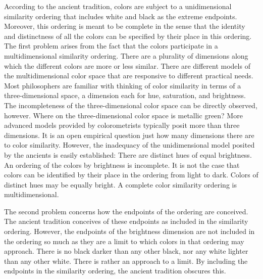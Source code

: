 According to the ancient tradition, colors are subject to a unidimensional similarity ordering that includes white and black as the extreme endpoints. Moreover, this ordering is meant to be complete in the sense that the identity and distinctness of all the colors can be specified by their place in this ordering. The first problem arises from the fact that the colors participate in a multidimensional similarity ordering. There are a plurality of dimensions along which the different colors are more or less similar. There are different models of the multidimensional color space that are responsive to different practical needs. Most philosophers are familiar with thinking of color similarity in terms of a three-dimensional space, a dimension each for hue, saturation, and brightness. The incompleteness of the three-dimensional color space can be directly observed, however. Where on the three-dimensional color space is metallic green? More advanced models provided by colorometrists typically posit more than three dimensions. It is an open empirical question just how many dimensions there are to color similarity. However, the inadequacy of the unidimensional model posited by the ancients is easily established: There are distinct hues of equal brightness. An ordering of the colors by brightness is incomplete. It is not the case that colors can be identified by their place in the ordering from light to dark. Colors of distinct hues may be equally bright. A complete color similarity ordering is multidimensional.

The second problem concerns how the endpoints of the ordering are conceived. The ancient tradition conceives of these endpoints as included in the similarity ordering. However, the endpoints of the brightness dimension are not included in the ordering so much as they are a limit to which colors in that ordering may approach. There is no black darker than any other black, nor any white lighter than any other white. There is rather an approach to a limit. By including the endpoints in the similarity ordering, the ancient tradition obscures this.

